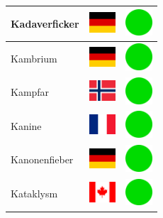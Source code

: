 \documentclass[12pt, a4paper, twoside]{report}
\begin{document}
\begin{center}
\begin{longtable}{|p{5cm}|p{2cm}|p{2cm}|}
 Kadaverficker                                              & \includegraphics[width=1cm]{../4x3/de} &   \includegraphics[width=1cm]{../likes/y} \\ \hline
 Kambrium                                                   & \includegraphics[width=1cm]{../4x3/de} &   \includegraphics[width=1cm]{../likes/y} \\ \hline
 Kampfar                                                    & \includegraphics[width=1cm]{../4x3/no} &   \includegraphics[width=1cm]{../likes/y} \\ \hline
 Kanine                                                     & \includegraphics[width=1cm]{../4x3/fr} &   \includegraphics[width=1cm]{../likes/y} \\ \hline
 Kanonenfieber                                              & \includegraphics[width=1cm]{../4x3/de} &   \includegraphics[width=1cm]{../likes/y} \\ \hline
 Kataklysm                                                  & \includegraphics[width=1cm]{../4x3/ca} &   \includegraphics[width=1cm]{../likes/y} \\ \hline

\end{longtable}
\end{center}
\end{document}
